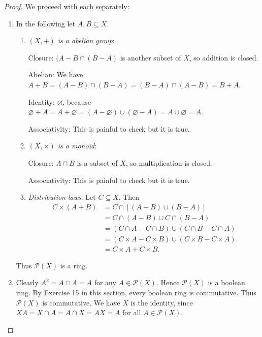 \documentclass[12pt]{article}
\theoremstyle{remark}
\theoremstyle{named}
\renewcommand{\em}{\varnothing}
\begin{document}
\begin{proof}
    We proceed with each separately:
    \begin{enumerate}
        \item In the following let \(A, B \subseteq X\).
        \begin{enumerate}[1.]
            \item \textit{\((X, +)\) is a abelian group}:
            
            Closure: \((A - B \cap (B - A)\) is another subset of \(X\), so addition is closed.

            Abelian: We have \(A + B = (A - B) \cap (B - A) = (B - A) \cap (A - B) = B + A\).
            
            Identity: \(\em\), because \(\em + A = A + \em = (A - \em) \cup (\em - A) = A \cup \em = A\).

            Associativity: This is painful to check but it is true.

            \item \textit{\((X, \times)\) is a monoid}: 
            
            Closure: \(A \cap B\) is a subset of \(X\), so multiplication is closed. 

            Associativity: This is painful to check but it is true.

            \item \textit{Distribution laws}: Let \(C \subseteq X\). Then 
            \begin{align*}
                C \times (A + B) &= C \cap [(A - B) \cup (B - A)] \\
                &= C \cap (A - B) \cup C \cap (B - A) \\
                &= (C \cap A - C \cap B) \cup (C \cap B - C \cap A) \\
                &= (C \times A - C \times B) \cup (C \times B - C \times A) \\
                &= C \times A + C \times B.
            \end{align*}
        \end{enumerate} 
        Thus \(\mathcal P(X)\) is a ring.

        \item Clearly \(A^2 = A \cap A = A\) for any \(A \in \mathcal P(X)\). Hence \(\mathcal P(X)\) is a boolean ring. By Exercise 15 in this section, every boolean ring is commutative. Thus \(\mathcal P(X)\) is commutative. We have \(X\) is the identity, since \(XA = X \cap A = A \cap X = AX = A\) for all \(A \in \mathcal P(X)\). 
    \end{enumerate}
\end{proof}
\end{document}
